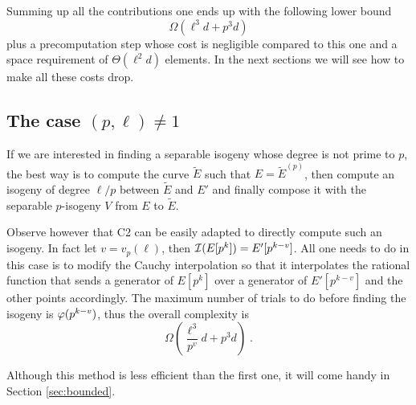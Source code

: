 Summing up all the contributions one ends up with the following lower
bound
\begin{equation}
  \label{eq:C2:complexity}
  \Omega(\ell^3d + p^3d)
\end{equation}
plus a precomputation step whose cost is negligible compared to this
one and a space requirement of $\Theta(\ell^2d)$ elements. In the next
sections we will see how to make all these costs drop.


\subsection{The case \texorpdfstring{$(p,\ell)\ne1$}{(p,l) different from 1}}
\label{sec:C2:non-prime}
If we are interested in finding a separable isogeny whose degree is
not prime to $p$, the best way is to compute the curve $\widetilde{E}$
such that $E = \widetilde{E}^{(p)}$, then compute an isogeny of degree
$\ell/p$ between $\widetilde{E}$ and $E'$ and finally compose it with
the separable $p$-isogeny $V$ from $E$ to $\widetilde{E}$.

Observe however that C2 can be easily adapted to directly compute such
an isogeny. In fact let $v=v_p(\ell)$, then $\mathcal{I}(E[p^k]) =
E'[p^{k-v}]$. All one needs to do in this case is to modify the Cauchy
interpolation so that it interpolates the rational function that sends
a generator of $E[p^k]$ over a generator of $E'[p^{k-v}]$ and the
other points accordingly. The maximum number of trials to do before
finding the isogeny is $\varphi(p^{k-v})$, thus the overall complexity
is
\begin{equation}
  \label{eq:C2:complexity-non-prime}
  \Omega\left(\frac{\ell^3}{p^v}d + p^3d\right)
  \;\text{.}
\end{equation}

Although this method is less efficient than the first one, it will
come handy in Section \ref{sec:bounded}.



%
